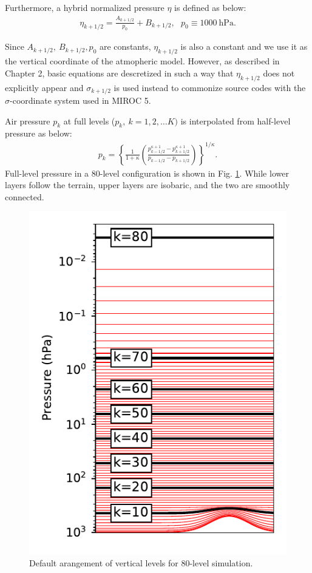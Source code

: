 Furthermore, a hybrid normalized pressure \(\eta\) is defined as below:
\begin{eqnarray}
\eta_{k+1/2} = \frac{A_{k+1/2}}{p_0} +B_{k+1/2},\ \ \ p_0\equiv 1000\ \mathrm{hPa}.
\end{eqnarray}

Since \(A_{k+1/2},\ B_{k+1/2}, p_0\) are constants, \(\eta_{k+1/2}\) is
also a constant and we use it as the vertical coordinate of the
atmopheric model.
However, as described in Chapter 2, basic equations
are descretized in such a way that \(\eta_{k+1/2}\) does not explicitly
appear and \(\sigma_{k+1/2}\) is used instead to commonize source codes
with the \(\sigma\)-coordinate system used in MIROC 5.

Air pressure \(p_k\) at full levels (\(p_k,\ k=1,2,\ldots K)\) is
interpolated from half-level pressure as below:
\begin{eqnarray}
 p_k = \left\{ \frac{1}{1+\kappa}
                     \left( \frac{  p^{\kappa +1}_{k-1/2}
                                  - p^{\kappa +1}_{k+1/2}      }
                                  { p_{k-1/2} - p_{k+1/2} }
                     \right)
              \right\}^{1/\kappa}.
\end{eqnarray}
Full-level pressure in a 80-level configuration is shown in Fig.
\ref{levels}. While lower layers follow the terrain, upper layers are
isobaric, and the two are smoothly connected.

\begin{figure}
\centering
\includegraphics{levels.pdf}
\caption{Default arangement of vertical levels for 80-level
simulation.\label{levels}}
\end{figure}

